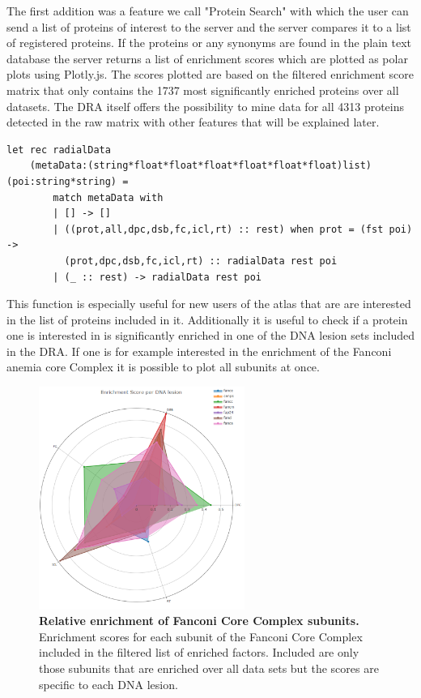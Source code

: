 The first addition was a feature we call "Protein Search" with which the user can send a list of proteins of interest to the server and the server compares it to a list of registered proteins. If the proteins or any synonyms are found in the plain text database the server returns a list of enrichment scores which are plotted as polar plots using Plotly.js. The scores plotted are based on the filtered enrichment score matrix that only contains the 1737 most significantly enriched proteins over all datasets. The DRA itself offers the possibility to mine data for all 4313 proteins detected in the raw matrix with other features that will be explained later.
\lstset{language=FSharp}
\begin{lstlisting}
let rec radialData 
    (metaData:(string*float*float*float*float*float*float)list) (poi:string*string) =
        match metaData with
        | [] -> []
        | ((prot,all,dpc,dsb,fc,icl,rt) :: rest) when prot = (fst poi) ->
          (prot,dpc,dsb,fc,icl,rt) :: radialData rest poi
        | (_ :: rest) -> radialData rest poi
\end{lstlisting}
This function is especially useful for new users of the atlas that are are interested in the list of proteins included in it. Additionally it is useful to check if a protein one is interested in is significantly enriched in one of the DNA lesion sets included in the DRA. If one is for example interested in the enrichment of the Fanconi anemia core Complex it is possible to plot all subunits at once.
\begin{figure}[H]
    \centering
    \includegraphics[width=0.6\textwidth]{resources/images/Results/fanc_enrichment.png}
    \caption[Relative enrichment of Fanconi Core Complex subunits]{\textbf{Relative enrichment of Fanconi Core Complex subunits. }Enrichment scores for each subunit of the Fanconi Core Complex included in the filtered list of enriched factors. Included are only those subunits that are enriched over all data sets but the scores are specific to each DNA lesion.}
    \label{fig:fanc_enrichment}
\end{figure}
